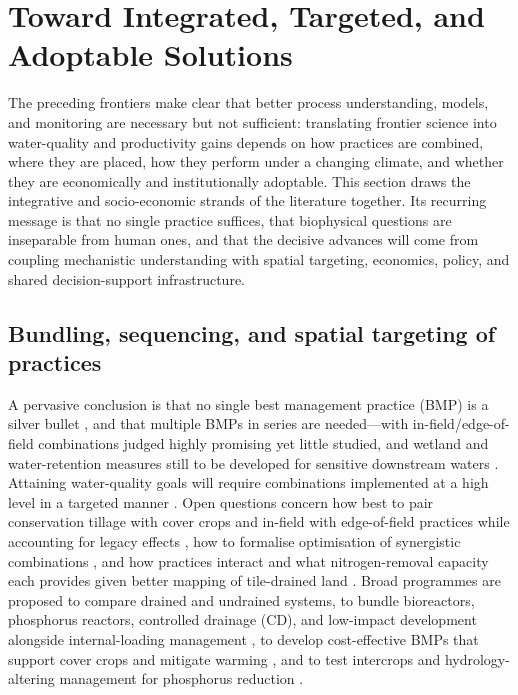\documentclass[11pt]{article}
\begin{document}
\section*{Toward Integrated, Targeted, and Adoptable Solutions}

The preceding frontiers make clear that better process understanding, models,
and monitoring are necessary but not sufficient: translating frontier science
into water-quality and productivity gains depends on how practices are
combined, where they are placed, how they perform under a changing climate, and
whether they are economically and institutionally adoptable. This section draws
the integrative and socio-economic strands of the literature together. Its
recurring message is that no single practice suffices, that biophysical
questions are inseparable from human ones, and that the decisive advances will
come from coupling mechanistic understanding with spatial targeting, economics,
policy, and shared decision-support infrastructure.

\subsection{Bundling, sequencing, and spatial targeting of practices}

A pervasive conclusion is that no single best management practice (BMP) is a
silver bullet \parencite{Sunohara2016}, and that multiple BMPs in series are
needed---with in-field/edge-of-field combinations judged highly promising yet
little studied, and wetland and water-retention measures still to be developed
for sensitive downstream waters \parencite{Lenhart2016}. Attaining water-quality
goals will require combinations implemented at a high level in a targeted manner
\parencite{Christianson2014}. Open questions concern how best to pair
conservation tillage with cover crops and in-field with edge-of-field practices
while accounting for legacy effects \parencite{Makhtoumi2025}, how to formalise
optimisation of synergistic combinations \parencite{Kreig2019}, and how
practices interact and what nitrogen-removal capacity each provides given better
mapping of tile-drained land \parencite{McLellan2015}. Broad programmes are
proposed to compare drained and undrained systems, to bundle bioreactors,
phosphorus reactors, controlled drainage (CD), and low-impact development
alongside internal-loading management \parencite{Baulch2019,Husk2024,Husk2017},
to develop cost-effective BMPs that support cover crops and mitigate warming
\parencite{Gupta2023}, and to test intercrops and hydrology-altering management
for phosphorus reduction \parencite{HernandezRamirez2011,GAYNOR1995b}.
\end{document}
